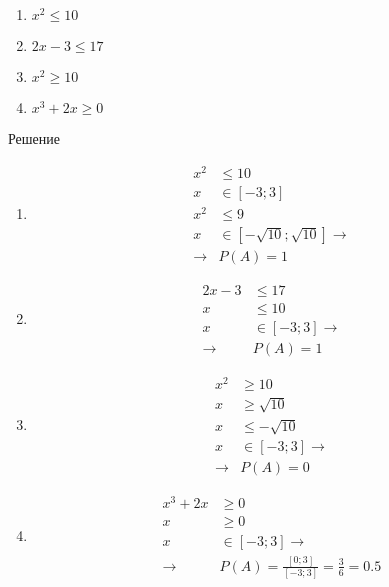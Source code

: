 \documentclass[a4paper,12pt]{extreport}
\begin{document}
\begin{enumerate}
	\item $x^2\leq10$
	\item $2x-3\leq17$
	\item $x^2\geq10$
	\item $x^3+2x\geq0$
\end{enumerate}

\begin{center}
Решение
\end{center}

\begin{enumerate}
	\item { 
		\begin{align*}
			x^2&\leq10\\
			x&\in[-3;3]\\
			x^2&\leq9\\
			x&\in[-\sqrt{10};\sqrt{10}]\longrightarrow\\
			\longrightarrow& P(A)=1
		\end{align*}
	}
	\item { 
		\begin{align*}
			2x-3&\leq17\\
			x&\leq10\\
			x&\in[-3;3]\longrightarrow\\
			\longrightarrow& P(A)=1
		\end{align*}
	}	
	\item { 
		\begin{align*}			
			x^2&\geq10\\
			x&\geq\sqrt{10}\\
			x&\leq-\sqrt{10}\\
			x&\in[-3;3]\longrightarrow\\
			\longrightarrow& P(A)=0
		\end{align*}
	}	
	\item { 
		\begin{align*}			
			x^3+2x&\geq0\\
			x&\geq0\\
			x&\in[-3;3]\longrightarrow\\			
			\longrightarrow& P(A)=\frac{[0; 3]}{[-3; 3]}=\frac{3}{6}=0.5
		\end{align*}
	}			
\end{enumerate}
\end{document}
